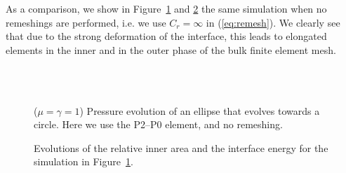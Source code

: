 As a comparison, we show in Figure~\ref{fig:ellipse_smooth} and
\ref{fig:ellipse_both_volumes_smooth} the same simulation when no remeshings are
performed, i.e. we use $C_r=\infty$ in (\ref{eq:remesh}). We clearly see that
due to the strong deformation of the interface, this leads to elongated elements
in the inner and in the outer phase of the bulk finite element mesh.
\begin{figure}[htbp]
\centering
{}\\
\\
\caption[Stokes ellipse pressure no remeshing]
{($\mu=\gamma=1$) Pressure evolution of an ellipse that evolves towards a
circle. Here we use the P2--P0 element, and no remeshing.}
\label{fig:ellipse_smooth}
\end{figure}
\begin{figure}[htbp]
\centering
{}
\caption[Stokes ellipse inner area and interface energy no remeshing]
{Evolutions of the relative inner area and the interface energy for
the simulation in Figure~\ref{fig:ellipse_smooth}.}
\label{fig:ellipse_both_volumes_smooth}
\end{figure}

